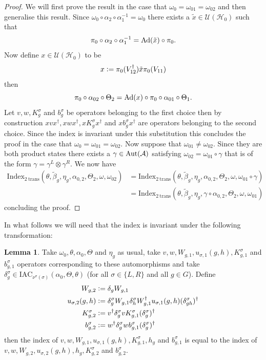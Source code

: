 \documentclass[12pt,a4paper,twoside]{article}
\newcommand{\IAC}{\textrm{IAC}}
\newcommand{\defeq}{\vcentcolon=}
\let\originalleft\left
\let\originalright\right
\renewcommand{\left}{\mathopen{}\mathclose\bgroup\originalleft}
\renewcommand{\right}{\aftergroup\egroup\originalright}
\newcommand{\UU}{\mathcal U}
\newcommand{\HH}{\mathcal H}
\renewcommand{\AA}{\mathcal A}
\newcommand{\Ad}[1]{\textrm{Ad}\left(#1\right)}
\newcommand{\Aut}[1]{\textrm{Aut}\left(#1\right)}
\theoremstyle{definition}
\newtheorem{lemma}[theorem]{Lemma}
\numberwithin{equation}{section}
\begin{document}
\begin{proof}
	We will first prove the result in the case that $\omega_0=\omega_{01}=\omega_{02}$ and then generalise this result. Since $\omega_0\circ\alpha_2\circ\alpha_1^{-1}=\omega_0$ there exists a $\tilde{x}\in\UU(\HH_0)$ such that
	\begin{equation}
		\pi_0\circ\alpha_2\circ\alpha_1^{-1}=\Ad{\tilde{x}}\circ\pi_0.
	\end{equation}
	Now define $x\in\UU(\HH_0)$ to be
	\begin{equation}
		x\defeq \pi_0(V_{12}^\dagger)\tilde{x} \pi_0(V_{11})
	\end{equation}
	then
	\begin{equation}
		\pi_0\circ\alpha_{02}\circ\Theta_2=\Ad{x}\circ\pi_0\circ\alpha_{01}\circ\Theta_1.
	\end{equation}
	Let $v,w,K_g^\sigma$ and $b_g^\sigma$ be operators belonging to the first choice then by construction $xvx^\dagger,xwx^\dagger,xK_g^\sigma x^\dagger$ and $xb_g^\sigma x^\dagger$ are operators belonging to the second choice. Since the index is invariant under this substitution this concludes the proof in the case that $\omega_0=\omega_{01}=\omega_{02}$. Now suppose that $\omega_{01}\neq\omega_{02}$. Since they are both product states there exists a $\gamma\in\Aut{\AA}$ satisfying $\omega_{02}=\omega_{01}\circ\gamma$ that is of the form $\gamma=\gamma^L\otimes\gamma^R$. We now have
	\begin{align}
		\textrm{Index}_{2\:\text{trans}}(\theta,\tilde{\beta}_g,\eta_g,\alpha_{0,2},\Theta_2,\omega,\omega_{02})&=\textrm{Index}_{2\:\text{trans}}(\theta,\tilde{\beta}_g,\eta_g,\alpha_{0,2},\Theta_2,\omega,\omega_{01}\circ\gamma)\\
		&=\textrm{Index}_{2\:\text{trans}}(\theta,\tilde{\beta}_g,\eta_g,\gamma\circ\alpha_{0,2},\Theta_2,\omega,\omega_{01})
	\end{align}
	concluding the proof.
\end{proof}
In what follows we will need that the index is invariant under the following transformation:
\begin{lemma}\label{lem:TransformationUnderDeltaTwoTranslations}
	Take $\omega_0,\theta,\alpha_0,\Theta$ and $\eta_g$ as usual, take $v,w,W_{g,1},u_{\sigma,1}(g,h),K_{g,1}^\sigma$ and $b_{g,1}^\sigma$ operators corresponding to these automorphisms and take $\delta^\sigma_g\in\IAC_{\nu^\sigma(\sigma)}(\alpha_0,\Theta,\theta)$ (for all $\sigma\in\{L,R\}$ and all $g\in G$). Define
	\begin{align}
		W_{g,2}&\defeq\delta_g W_{g,1}\\
		u_{\sigma,2}(g,h)&\defeq \delta_g^\sigma W_{g,1}\delta_h^\sigma W_{g,1}^\dagger u_{\sigma,1}(g,h)(\delta_{gh}^\sigma)^\dagger\\
		K^\sigma_{g,2}&\defeq v^\dagger \delta_g^\sigma v K_{g,1}^\sigma (\delta_g^\sigma)^\dagger\\
		b_{g,2}^\sigma&\defeq w^\dagger\delta^\sigma_g w b_{g,1}^\sigma (\delta^\sigma_g)^\dagger
	\end{align}
	then the index of $v,w,W_{g,1},u_{\sigma,1}(g,h),K_{g,1}^\sigma,h_g$ and $b_{g,1}^\sigma$ is equal to the index of $v,w,W_{g,2},u_{\sigma,2}(g,h),h_g,K_{g,2}^\sigma$ and $b_{g,2}^\sigma$.
\end{lemma}
\end{document}
